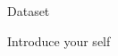 \documentclass[aspectratio=169]{beamer}
\begin{document}
\begin{frame}{Dataset}

        \begin{note}
            {Introduce your self}
        \end{note}
    \end{frame}
\end{document}
